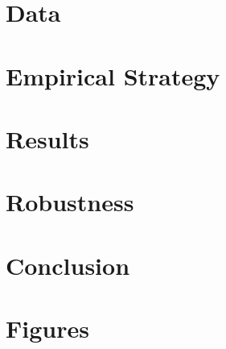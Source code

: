 \documentclass[12pt,notitlepage]{article}
\begin{document}
\lipsum[1]

\section{Data}

\lipsum[2-5]

\section{Empirical Strategy}

\lipsum[6-9]

\section{Results}

\lipsum[10-13]

\section{Robustness}

\lipsum[14-15]

\section{Conclusion}

\lipsum[16-17]

\newpage

\begin{spacing}{1} 
	\def\bibfont{\small}
	\renewcommand\refname{References}
	  
	
\end{spacing}

\newpage

\section*{Figures}
\end{document}
